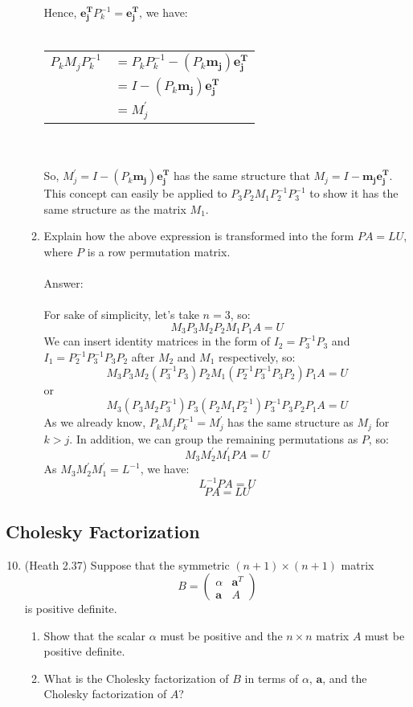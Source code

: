 \documentclass{article}
\renewcommand{\vec}[1]{\mathbf{#1}}
\begin{document}
\begin{enumerate}
\begin{enumerate}
  Hence, $\vec{e_j^T}P_k^{-1}=\vec{e_j^T}$, we have:\\
\\
\begin{tabular}{rl}
$P_kM_jP_k^{-1}$ & $= P_kP_k^{-1}-(P_k\vec{m_j})\vec{e_j^T}$ \\
 & $= I-(P_k\vec{m_j})\vec{e_j^T}$ \\
 & $= M_j^\prime$ \\
\end{tabular}
\\
\\
So, $M_j^\prime=I-(P_k\vec{m_j})\vec{e_j^T}$ has the same structure that $M_j=I-\vec{m_j}\vec{e_j^T}$. This concept can easily be applied to $P_3 P_2 M_1 P_2^{-1} P_3^{-1}$ to show it has the same structure as the matrix $M_1$.
 
  \item Explain how the above expression is transformed into the form $PA = LU$, where $P$ is a row permutation matrix.\\
  \\
  Answer:\\
  \\
  For sake of simplicity, let's take $n=3$, so:
  $$M_3 P_3 M_2 P_2 M_1 P_1 A = U$$
  We can insert identity matrices in the form of $I_2=P_3^{-1}P_3$ and $I_1=P_2^{-1}P_3^{-1}P_3P_2$ after $M_2$ and $M_1$ respectively, so:
  $$M_3 P_3 M_2 (P_3^{-1} P_3) P_2 M_1 (P_2^{-1} P_3^{-1} P_3 P_2) P_1 A = U$$
  or
  $$M_3 (P_3 M_2 P_3^{-1}) P_3 (P_2 M_1 P_2^{-1}) P_3^{-1} P_3 P_2 P_1 A = U$$
  As we already know, $P_kM_jP_k^{-1}=M_j^\prime$ has the same structure as $M_j$ for $k>j$. In addition, we can group the remaining permutations as $P$, so:
  $$M_3 M_2^\prime M_1^\prime P A = U$$
  As $M_3 M_2^\prime M_1^\prime = L^{-1}$, we have:
  $$L^{-1} P A = U$$
  $$P A = L U$$
  \end{enumerate}
\end{enumerate}

\subsection*{Cholesky Factorization}
\begin{enumerate}
\setcounter{enumi}{9}
\item (Heath 2.37) Suppose that the symmetric $(n+1) \times (n+1)$ matrix
$$
B = \begin{pmatrix}
\alpha & \vec{a}^T \\
\vec{a} & A
\end{pmatrix}
$$
is positive definite.
\begin{enumerate}
\item Show that the scalar $\alpha$ must be positive and the $n \times n$ matrix $A$ must be positive definite.
\item What is the Cholesky factorization of $B$ in terms of $\alpha$, $\vec{a}$, and the Cholesky factorization of $A$?
\end{enumerate}
\end{enumerate}
\end{document}
